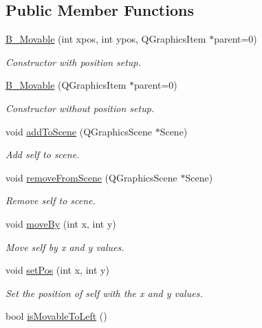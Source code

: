 \subsection*{Public Member Functions}
\begin{DoxyCompactItemize}
\item 
\hyperlink{class_b___movable_ac874fc12d19502117d0bfc396d1059d2}{B\+\_\+\+Movable} (int xpos, int ypos, Q\+Graphics\+Item $\ast$parent=0)
\begin{DoxyCompactList}\small\item\em Constructor with position setup. \end{DoxyCompactList}\item 
\hyperlink{class_b___movable_aef88fa8933731c08731796a9ee3fda6b}{B\+\_\+\+Movable} (Q\+Graphics\+Item $\ast$parent=0)
\begin{DoxyCompactList}\small\item\em Constructor without position setup. \end{DoxyCompactList}\item 
void \hyperlink{class_b___movable_a8a23ac4b1692d95607dcccd6d6c9a973}{add\+To\+Scene} (Q\+Graphics\+Scene $\ast$Scene)
\begin{DoxyCompactList}\small\item\em Add self to scene. \end{DoxyCompactList}\item 
void \hyperlink{class_b___movable_aa4d26e877655021ef70bc6914fe04418}{remove\+From\+Scene} (Q\+Graphics\+Scene $\ast$Scene)
\begin{DoxyCompactList}\small\item\em Remove self to scene. \end{DoxyCompactList}\item 
void \hyperlink{class_b___movable_a55fb8069fc55c4edabd2ac076acdee17}{move\+By} (int x, int y)
\begin{DoxyCompactList}\small\item\em Move self by x and y values. \end{DoxyCompactList}\item 
void \hyperlink{class_b___movable_aca717ec608426940422f1bc658201bf5}{set\+Pos} (int x, int y)
\begin{DoxyCompactList}\small\item\em Set the position of self with the x and y values. \end{DoxyCompactList}\item 
bool \hyperlink{class_b___movable_a5d28eb38771a241e59a403876670fa52}{is\+Movable\+To\+Left} ()

\end{DoxyCompactItemize}
